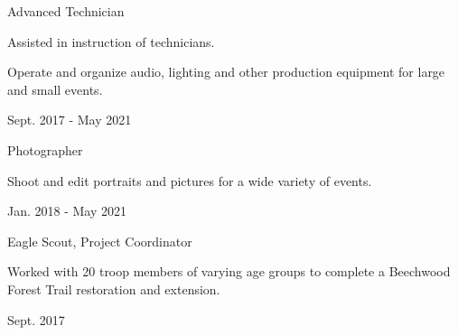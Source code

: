 




  \cventrysubteaching
    {Advanced Technician}
    {
      \begin{cvitems}
        \item {Assisted in instruction of technicians.}
        \item {Operate and organize audio, lighting and other production equipment for large and small events.}
      \end{cvitems}
    }
    {Sept. 2017 - May 2021}




	  \cventrysubteaching
	    {Photographer}
	    {
	      \begin{cvitems}
	        \item {Shoot and edit portraits and pictures for a wide variety of events.}
	      \end{cvitems}
	    }
	    {Jan. 2018 - May 2021}


  	\cventrysubteaching
	    {Eagle Scout, Project Coordinator}
	    {
	      \begin{cvitems}
	        \item {Worked with 20 troop members of varying age groups to complete a Beechwood Forest Trail restoration and extension.}
	      \end{cvitems}
	    }
	    {Sept. 2017}


\begin{cvskills}



\end{cvskills}




